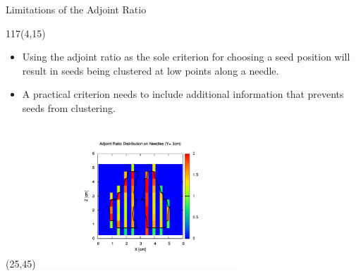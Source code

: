 \documentclass{beamer}
\begin{document}
\begin{frame}{Limitations of the Adjoint Ratio}

  \begin{textblock}{117}(4,15)
    \begin{itemize}
      \item Using the adjoint ratio as the sole criterion for choosing a seed
        position will result in seeds being clustered at low points along a 
        needle.
        \medskip
      \item A practical criterion needs to include additional information that
        prevents seeds from clustering.
    \end{itemize}
  \end{textblock}

  \begin{textblock}{20}(25,45)
    \includegraphics[width=3in]{figures/adjoint_ratio_needles-yslice.pdf}
  \end{textblock}

\end{frame}

\end{document}
